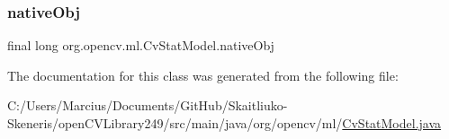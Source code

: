 \subsubsection{\texorpdfstring{native\+Obj}{nativeObj}}
{\footnotesize\ttfamily final long org.\+opencv.\+ml.\+Cv\+Stat\+Model.\+native\+Obj\hspace{0.3cm}{\ttfamily [protected]}}



The documentation for this class was generated from the following file\+:\begin{DoxyCompactItemize}
\item 
C\+:/\+Users/\+Marcius/\+Documents/\+Git\+Hub/\+Skaitliuko-\/\+Skeneris/open\+C\+V\+Library249/src/main/java/org/opencv/ml/\mbox{\hyperlink{_cv_stat_model_8java}{Cv\+Stat\+Model.\+java}}\end{DoxyCompactItemize}
